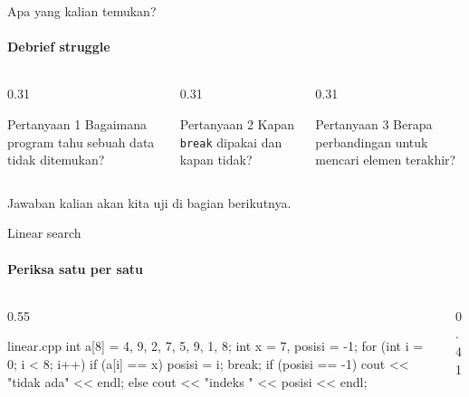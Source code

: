 \documentclass[t]{beamer}
\begin{document}
\begin{frame}{Apa yang kalian temukan?}
\framesubtitle{Debrief struggle}
\begin{columns}[T]
\begin{column}{0.31\textwidth}
\begin{BlokGelap}{Pertanyaan 1}
Bagaimana program tahu sebuah data tidak ditemukan?
\end{BlokGelap}
\end{column}
\begin{column}{0.31\textwidth}
\begin{BlokGelap}{Pertanyaan 2}
Kapan \texttt{break} dipakai dan kapan tidak?
\end{BlokGelap}
\end{column}
\begin{column}{0.31\textwidth}
\begin{BlokGelap}{Pertanyaan 3}
Berapa perbandingan untuk mencari elemen terakhir?
\end{BlokGelap}
\end{column}
\end{columns}
\vspace{10pt}
Jawaban kalian akan kita uji di bagian berikutnya.
\end{frame}


\begin{frame}[fragile]{Linear search}
\framesubtitle{Periksa satu per satu}
\begin{columns}[T]
\begin{column}{0.55\textwidth}
\begin{Kode}[]{linear.cpp}
int a[8] = {4, 9, 2, 7, 5, 9, 1, 8};
int x = 7, posisi = -1;
for (int i = 0; i < 8; i++) {
    if (a[i] == x) {
        posisi = i;
        break;
    }
}
if (posisi == -1) cout << "tidak ada" << endl;
else cout << "indeks " << posisi << endl;
\end{Kode}
\end{column}
\begin{column}{0.41\textwidth}
\end{column}
\end{columns}
\end{frame}
\end{document}
